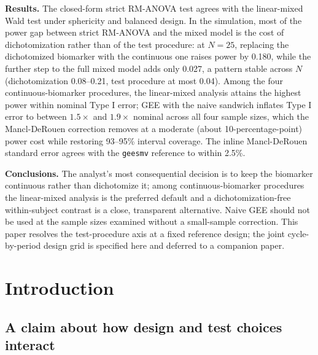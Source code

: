 \documentclass[
  11pt,
]{article}
\begin{document}
\textbf{Results.} The closed-form strict RM-ANOVA test agrees with the
linear-mixed Wald test under sphericity and balanced design. In
the simulation, most of the power gap between strict RM-ANOVA and
the mixed model is the cost of dichotomization rather than of the
test procedure: at \(N = 25\), replacing the dichotomized biomarker
with the continuous one raises power by 0.180, while the further
step to the full mixed model adds only 0.027, a pattern stable
across \(N\) (dichotomization 0.08--0.21, test procedure at most
0.04). Among the four continuous-biomarker procedures, the
linear-mixed analysis attains the highest power within nominal
Type I error; GEE with the naive sandwich inflates Type I error
to between \(1.5\times\) and \(1.9\times\) nominal across all four
sample sizes, which the Mancl-DeRouen correction removes at a
moderate (about 10-percentage-point) power cost while restoring
93--95\% interval coverage. The inline Mancl-DeRouen standard
error agrees with the \texttt{geesmv} reference to within 2.5\%.

\textbf{Conclusions.} The analyst's most consequential decision is to
keep the biomarker continuous rather than dichotomize it; among
continuous-biomarker procedures the linear-mixed analysis is the
preferred default and a dichotomization-free within-subject
contrast is a close, transparent alternative. Naive GEE should
not be used at the sample sizes examined without a small-sample
correction. This paper resolves the test-procedure axis at a
fixed reference design; the joint cycle-by-period design grid is
specified here and deferred to a companion paper.

\section{Introduction}\label{introduction}

\subsection{A claim about how design and test choices interact}\label{a-claim-about-how-design-and-test-choices-interact}
\end{document}
